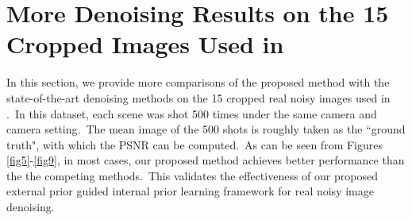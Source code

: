 \documentclass[10pt,onecolumn,letterpaper]{article}
\begin{document}
\section{More Denoising Results on the 15 Cropped Images Used in \cite{crosschannel2016}}
In this section, we provide more comparisons of the proposed method with the state-of-the-art denoising methods on the 15 cropped real noisy images used in \cite{crosschannel2016}.\ In this dataset, each scene was shot 500 times under the same camera and camera setting.\ The mean image of the 500 shots is roughly taken as the ``ground truth", with which the PSNR can be computed.\ As can be seen from Figures \ref{fig5}-\ref{fig9}, in most cases, our proposed method achieves better performance than the the competing methods.\ This validates the effectiveness of our proposed external prior guided internal prior learning framework for real noisy image denoising.
\end{document}
